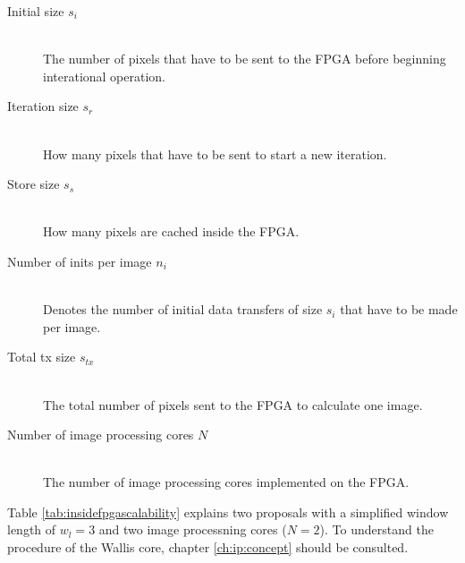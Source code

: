 \begin{description}
    \item[Initial size $s_i$]\hfill \\
    The number of pixels that have to be sent to the FPGA before beginning
    interational operation.
    \item[Iteration size $s_r$]\hfill \\
    How many pixels that have to be sent to start a new iteration.
    \item[Store size $s_s$]\hfill \\
    How many pixels are cached inside the FPGA.
    \item[Number of inits per image $n_i$]\hfill \\
    Denotes the number of initial data transfers of size $s_i$ that have to be
    made per image.
    \item[Total tx size $s_{tx}$]\hfill \\
    The total number of pixels sent to the FPGA to calculate one image.
    \item[Number of image processing cores $N$]\hfill \\
    The number of image processing cores implemented on the FPGA.
\end{description}

Table \ref{tab:insidefpgascalability} explains two proposals with a simplified
window length of $w_l=3$ and two image processning cores ($N=2$). To understand
the procedure of the Wallis core, chapter \ref{ch:ip:concept} should be
consulted.

